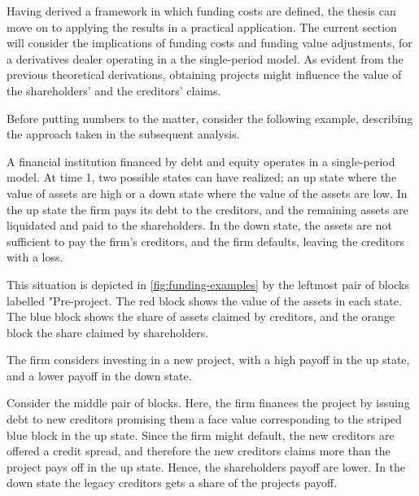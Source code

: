 \documentclass[main.tex]{subfiles}
\begin{document}
    Having derived a framework in which funding costs are defined, 
    the thesis can move on to applying the results in a practical application.
    The current section will consider the implications of funding costs and funding value adjustments,
    for a derivatives dealer operating in a the single-period model.
    As evident from the previous theoretical derivations, 
    obtaining projects might influence the value of the shareholders' and the creditors' claims.

    Before putting numbers to the matter, consider the following example,
    describing the approach taken in the subsequent analysis.

    \begin{example}
    
    A financial institution financed by debt and equity operates in a single-period model.
    At time 1, two possible states can have realized;
    an up state where the value of assets are high
    or a down state where the value of the assets are low.
    In the up state the firm pays its debt to the creditors,
    and the remaining assets are liquidated and paid to the shareholders.
    In the down state, the assets are not sufficient to pay the firm's creditors, 
    and the firm defaults, leaving the creditors with a loss. 

    This situation is depicted in \cref{fig:funding-examples} 
    by the leftmost pair of blocks labelled "Pre-project. 
    The \textcolor{wtf-red}{red block} shows the value of the assets in each state.
    The \textcolor{wtf-blue}{blue block} shows the share of assets claimed by creditors,
    and the \textcolor{wtf-orange}{orange block} the share claimed by shareholders.

    The firm considers investing in a new project, with a high payoff in the up state,
    and a lower payoff in the down state.

    \newcommand{\striped}[2]{%
        \raisebox{-3pt}{%
        \tikz{%
            \draw%
                node[inner sep=0, outer sep=0] {\textcolor{#1}{#2}}%
                node[
                    fill, 
                    pattern=north east lines, 
                    pattern color=white,
                    inner sep=0, outer sep=0,
                ] {\phantom{#2}};}%
        }%
    }

    Consider the middle pair of blocks.
    Here, the firm finances the project by issuing debt to new creditors
    promising them a face value corresponding to the striped blue block in the up state.
    Since the firm might default, the new creditors are offered a credit spread,
    and therefore the new creditors claims more than the project pays off in the up state.
    Hence, the shareholders payoff are lower. 
    In the down state the legacy creditors gets a share of the projects payoff.


\end{example}
\end{document}
